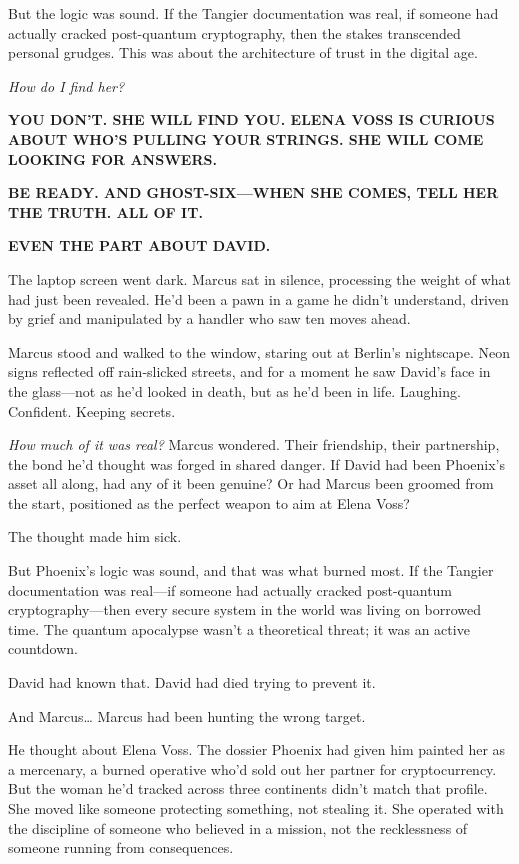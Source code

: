 But the logic was sound. If the Tangier documentation was real, if someone had actually cracked post-quantum cryptography, then the stakes transcended personal grudges. This was about the architecture of trust in the digital age.

\emph{How do I find her?}

\textbf{YOU DON'T. SHE WILL FIND YOU. ELENA VOSS IS CURIOUS ABOUT WHO'S PULLING YOUR STRINGS. SHE WILL COME LOOKING FOR ANSWERS.}

\textbf{BE READY. AND GHOST-SIX---WHEN SHE COMES, TELL HER THE TRUTH. ALL OF IT.}

\textbf{EVEN THE PART ABOUT DAVID.}

The laptop screen went dark. Marcus sat in silence, processing the weight of what had just been revealed. He'd been a pawn in a game he didn't understand, driven by grief and manipulated by a handler who saw ten moves ahead.

Marcus stood and walked to the window, staring out at Berlin's nightscape. Neon signs reflected off rain-slicked streets, and for a moment he saw David's face in the glass---not as he'd looked in death, but as he'd been in life. Laughing. Confident. Keeping secrets.

\emph{How much of it was real?} Marcus wondered. Their friendship, their partnership, the bond he'd thought was forged in shared danger. If David had been Phoenix's asset all along, had any of it been genuine? Or had Marcus been groomed from the start, positioned as the perfect weapon to aim at Elena Voss?

The thought made him sick.

But Phoenix's logic was sound, and that was what burned most. If the Tangier documentation was real---if someone had actually cracked post-quantum cryptography---then every secure system in the world was living on borrowed time. The quantum apocalypse wasn't a theoretical threat; it was an active countdown.

David had known that. David had died trying to prevent it.

And Marcus\ldots{} Marcus had been hunting the wrong target.

He thought about Elena Voss. The dossier Phoenix had given him painted her as a mercenary, a burned operative who'd sold out her partner for cryptocurrency. But the woman he'd tracked across three continents didn't match that profile. She moved like someone protecting something, not stealing it. She operated with the discipline of someone who believed in a mission, not the recklessness of someone running from consequences.

